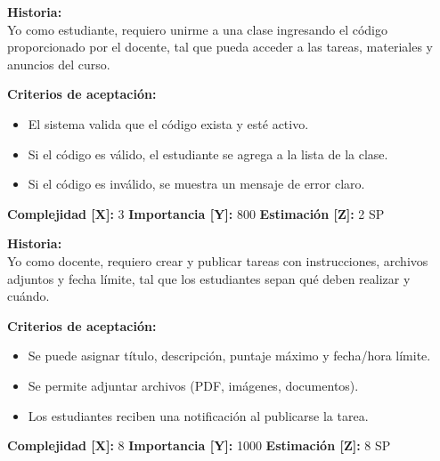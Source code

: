 \documentclass[12pt,a4paper]{article}
\begin{document}
\begin{tcolorbox}[title=\textbf{HU-12: Unirse a una clase mediante código de acceso}]
\textbf{Historia:} \\
Yo como estudiante, requiero unirme a una clase ingresando el código proporcionado por el docente, tal que pueda acceder a las tareas, materiales y anuncios del curso.

\vspace{0.5em}
\textbf{Criterios de aceptación:}
\begin{itemize}
    \item El sistema valida que el código exista y esté activo.
    \item Si el código es válido, el estudiante se agrega a la lista de la clase.
    \item Si el código es inválido, se muestra un mensaje de error claro.
\end{itemize}
\textbf{Complejidad [X]:} 3 \hfill \textbf{Importancia [Y]:} 800 \hfill \textbf{Estimación [Z]:} 2 SP
\end{tcolorbox}

\vspace{0.5em}

\begin{tcolorbox}[title=\textbf{HU-13: Publicar una tarea con fecha de entrega}]
\textbf{Historia:} \\
Yo como docente, requiero crear y publicar tareas con instrucciones, archivos adjuntos y fecha límite, tal que los estudiantes sepan qué deben realizar y cuándo.

\vspace{0.5em}
\textbf{Criterios de aceptación:}
\begin{itemize}
    \item Se puede asignar título, descripción, puntaje máximo y fecha/hora límite.
    \item Se permite adjuntar archivos (PDF, imágenes, documentos).
    \item Los estudiantes reciben una notificación al publicarse la tarea.
\end{itemize}
\textbf{Complejidad [X]:} 8 \hfill \textbf{Importancia [Y]:} 1000 \hfill \textbf{Estimación [Z]:} 8 SP
\end{tcolorbox}

\vspace{0.5em}
\end{document}
